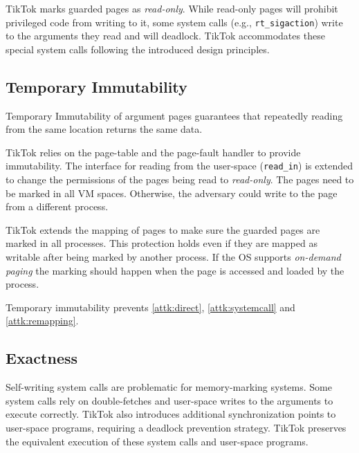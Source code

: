 \documentclass[conference]{IEEEtran}
\newcommand{\sysname}{TikTok}
\begin{document}
\sysname{} marks guarded pages as \emph{read-only}. While read-only pages will
prohibit privileged code from writing to it, some system calls (e.g.,
\texttt{rt\_sigaction}) write to the arguments they read and will deadlock.
\sysname{} accommodates these special system calls following the introduced
design principles.



\subsection{Temporary Immutability} \label{subsec:tempimmut}

Temporary Immutability of argument pages guarantees that repeatedly reading from
the same location returns the same data.

\sysname{} relies on the
page-table and the page-fault handler to provide immutability. The interface for
reading from the user-space (\texttt{read\_in}) is extended to change the
permissions of the pages being read to \emph{read-only}. The pages need to be
marked in all VM spaces. Otherwise, the adversary could write to the
page from a different process.

\sysname{} extends the mapping of pages to make sure the guarded pages are marked in
all processes. This protection holds even if they are mapped as writable after
being marked by another process. If the OS supports \emph{on-demand paging} the
marking should happen when the page is accessed and loaded by the process.

Temporary immutability prevents \autoref{attk:direct}, \autoref{attk:systemcall}
and \autoref{attk:remapping}.


\subsection{Exactness} \label{subsec:exactness}

Self-writing system calls are problematic for memory-marking systems. Some
system calls rely on double-fetches and user-space writes to the arguments to
execute correctly. \sysname{} also introduces additional synchronization points
to user-space programs, requiring a deadlock prevention strategy. \sysname{}
preserves the equivalent execution of these system calls and user-space
programs. 
\end{document}
